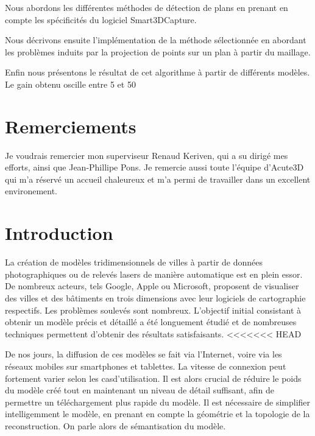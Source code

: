 ﻿\documentclass[12pt, twoside]{article}
\let\oldsection\section
\def\section{\cleardoublepage\oldsection}
\begin{document}
Nous abordons les différentes méthodes de détection de plans en prenant en compte les spécificités du logiciel Smart3DCapture.

Nous décrivons ensuite l'implémentation de la méthode sélectionnée en abordant les problèmes induits par la projection de points sur un plan à partir du maillage.

Enfin nous présentons le résultat de cet algorithme à partir de différents modèles. Le gain obtenu oscille entre 5 et 50%

\section*{Remerciements}
Je voudrais remercier mon superviseur Renaud Keriven, qui a su dirigé mes efforts, ainsi que Jean-Phillipe Pons. Je remercie aussi toute l'équipe d'Acute3D qui m'a réservé un accueil chaleureux et m'a permi de travailler dans un excellent environement.
\newpage

\tableofcontents
\newpage

\section*{Introduction}
La création de modèles tridimensionnels de villes à partir de données photographiques ou de relevés lasers de manière automatique est en plein essor. De nombreux acteurs, tels Google, Apple ou Microsoft, proposent de visualiser des villes et des bâtiments en trois dimensions avec leur logiciels de cartographie respectifs. Les problèmes soulevés sont nombreux. L'objectif initial consistant à obtenir un modèle précis et détaillé a été longuement étudié et de nombreuses techniques permettent d'obtenir des résultats satisfaisants.
<<<<<<< HEAD

De nos jours, la diffusion de ces modèles se fait via l'Internet, voire via les réseaux mobiles sur smartphones et tablettes. La vitesse de connexion peut fortement varier selon les casd'utilisation. Il est alors crucial de réduire le poids du modèle créé tout en maintenant un niveau de détail suffisant, afin de permettre un téléchargement plus rapide du modèle. Il est nécessaire de simplifier intelligemment le modèle, en prenant en compte la géométrie et la topologie de la reconstruction. On parle alors de sémantisation du modèle.
\end{document}
